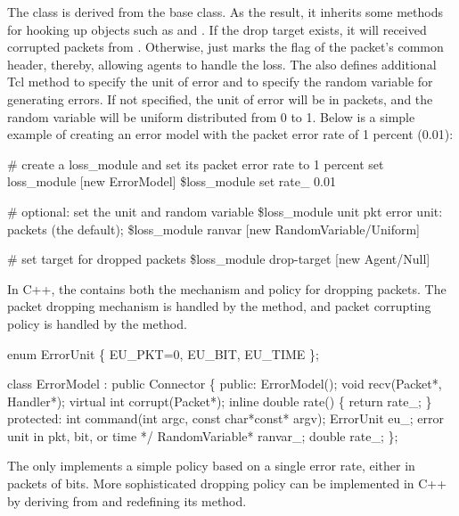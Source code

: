 The  class is derived from the  base
class.  As the result, it inherits some methods for hooking up objects
such as  and .  If the drop target
exists, it will received corrupted packets from .
Otherwise,  just marks the  flag of the
packet's common header, thereby, allowing agents to handle the loss.
The  also defines additional Tcl method  to
specify the unit of error and  to specify the random
variable for generating errors.  If not specified, the unit of error
will be in packets, and the random variable will be uniform distributed
from 0 to 1.  Below is a simple example of creating an error model with
the packet error rate of 1 percent (0.01):
\begin{program}
        # create a loss_module and set its packet error rate to 1 percent
        set loss_module [new ErrorModel]
        \$loss_module set rate_ 0.01

        # {\cf optional:  set the unit and random variable}
        \$loss_module unit pkt            \; error unit: packets (the default);
        \$loss_module ranvar [new RandomVariable/Uniform]

        # {\cf set target for dropped packets}
        \$loss_module drop-target [new Agent/Null]
\end{program}

In C++, the  contains both the mechanism and policy for
dropping packets.  The packet dropping mechanism is handled by the
 method, and packet corrupting policy is handled by the
 method.
\begin{program}
        enum ErrorUnit \{ EU_PKT=0, EU_BIT, EU_TIME \};

        class ErrorModel : public Connector \{
        public:
                ErrorModel();
                void recv(Packet*, Handler*);
                virtual int corrupt(Packet*);
                inline double rate() \{ return rate_; \}
        protected:
                int command(int argc, const char*const* argv);
                ErrorUnit eu_;          \* error unit in pkt, bit, or time */
                RandomVariable* ranvar_;
                double rate_;
        \};
\end{program}
The  only implements a simple policy based on a single
error rate, either in packets of bits.  More sophisticated dropping
policy can be implemented in C++ by deriving from  and
redefining its  method.

